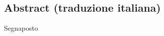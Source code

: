
\begin{otherlanguage}{italian}

    \newpage
    \subsection{Abstract (traduzione italiana)}

    Segnaposto

\end{otherlanguage}
